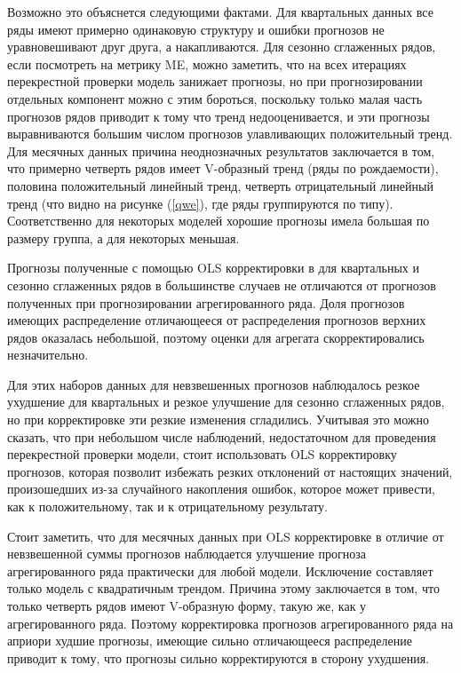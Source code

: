 \documentclass[12pt,a4paper, oneside]{extreport}
\begin{document}
	Возможно это объяснется следующими фактами. Для квартальных данных все ряды имеют примерно одинаковую структуру и  ошибки прогнозов не уравновешивают друг друга, а накапливаются.  Для сезонно сглаженных рядов, если посмотреть на метрику  ME, можно заметить, что на всех итерациях перекрестной проверки модель занижает прогнозы, но при прогнозировании отдельных компонент можно с этим бороться, поскольку только малая часть прогнозов рядов приводит к тому что тренд недооценивается, и эти прогнозы выравниваются большим числом прогнозов улавливающих положительный тренд.     Для месячных данных причина неоднозначных результатов заключается в   том, что примерно четверть рядов имеет V-образный тренд (ряды по рождаемости), половина положительный линейный тренд, четверть отрицательный линейный тренд (что видно на рисунке (\ref{qwe}),   где ряды группируются по типу).  Соответственно для некоторых моделей хорошие  прогнозы  имела большая по размеру группа, а для некоторых меньшая.
	
	

Прогнозы полученные с помощью OLS  корректировки в для квартальных и сезонно сглаженных рядов в большинстве случаев  не отличаются от прогнозов полученных при прогнозировании агрегированного ряда. Доля  прогнозов имеющих распределение отличающееся от распределения прогнозов верхних рядов оказалась небольшой, поэтому оценки для агрегата скорректировались незначительно.   

Для этих наборов данных для невзвешенных  прогнозов наблюдалось  резкое  ухудшение для квартальных и резкое улучшение для сезонно сглаженных рядов, но при корректировке эти резкие изменения сгладились. Учитывая это можно сказать, что при небольшом числе наблюдений, недостаточном для проведения перекрестной проверки модели, стоит    использовать OLS корректировку   прогнозов, которая позволит избежать резких отклонений от настоящих значений, произошедших из-за случайного накопления ошибок, которое может привести, как  к положительному, так и к отрицательному результату.

Стоит заметить, что для месячных данных при OLS корректировке в отличие от     невзвешенной суммы прогнозов наблюдается улучшение прогноза агрегированного ряда практически для любой модели. Исключение составляет только модель с квадратичным трендом. Причина этому заключается в том, что только четверть рядов имеют V-образную форму, такую же, как у  агрегированного  ряда.  Поэтому корректировка прогнозов агрегированного ряда на априори худшие  прогнозы, имеющие сильно отличающееся распределение приводит к тому, что прогнозы сильно корректируются в сторону ухудшения. 
\end{document}
